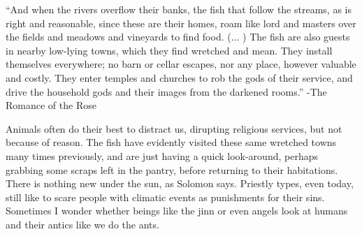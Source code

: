\begin{footnotesize}
\begin{sffamily}
``And when the rivers overflow their banks, the fish that follow the streams, as is right and reasonable, since these are their homes, roam like lord and masters over the fields and meadows and vineyards to find food. (... ) The fish are also guests in nearby low-lying towns, which they find wretched and mean. They install themselves everywhere; no barn or cellar escapes, nor any place, however valuable and costly. They enter temples and churches to rob the gods of their service, and drive the household gods and their images from the darkened rooms.'' -The Romance of the Rose

Animals often do their best to distract us, dirupting religious services, but not because of reason. The fish have evidently visited these same wretched towns many times previously, and are just having a quick look-around, perhaps grabbing some scraps left in the pantry, before returning to their habitations. There is nothing new under the sun, as Solomon says. Priestly types, even today, still like to scare people with climatic events as punishments for their sins. Sometimes I wonder whether beings like the jinn or even angels look at humans and their antics like we do the ants.


\hfill

\end{sffamily}
\end{footnotesize}


